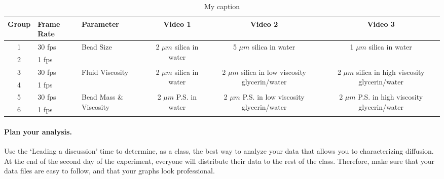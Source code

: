 \begin{table}[]
\centering
\begin{tabular}{|c|p{1.5cm}|p{2.1cm}|c|c|c|}
\hline
\textbf{Group} & \textbf{Frame Rate} & \textbf{Parameter} & \textbf{Video 1} & \textbf{Video 2} & \textbf{Video 3} \\ \hline
1 & 30 fps & \multirow{2}{2.1cm}{Bead Size} & \multirow{2}{2.3cm}{2 $\mu m$ silica in water} & \multirow{2}{3cm}{5 $\mu m$ silica in water} & \multirow{2}{3cm}{1 $\mu m$ silica in water} \\ \cline{1-2}
2 & 1 fps &  &  &  &  \\ \hline
3 & 30 fps  & \multirow{2}{2.1cm}{Fluid Viscosity} & \multirow{2}{2.3cm}{2 $\mu m$ silica in water} & \multirow{2}{3cm}{2 $\mu m$ silica in low viscosity glycerin/water} & \multirow{2}{3cm}{2 $\mu m$ silica in high viscosity glycerin/water} \\ \cline{1-2}
4 & 1 fps & & & & \\ \hline
5 & 30 fps & \multirow{2}{2.1cm}{Bead Mass \& Viscosity} & \multirow{2}{2.2cm}{2 $\mu m$ P.S. in water} & \multirow{2}{2.8cm}{2 $\mu m$ P.S. in low viscosity glycerin/water} & \multirow{2}{3cm}{2 $\mu m$ P.S. in high viscosity glycerin/water} \\ \cline{1-2}
6 & 1 fps & & & & \\ \hline
\end{tabular}
\caption{My caption}
\label{tab:exp3video_v2}
\end{table}

\paragraph*{Plan your analysis.} Use the `Leading a discussion' time to determine, as a class, the best way to analyze your data that allows you to characterizing diffusion.
At the end of the second day of the experiment,  everyone will distribute their data to the rest of the class.
Therefore, make sure that your data files are easy to follow, and that your graphs look professional.

